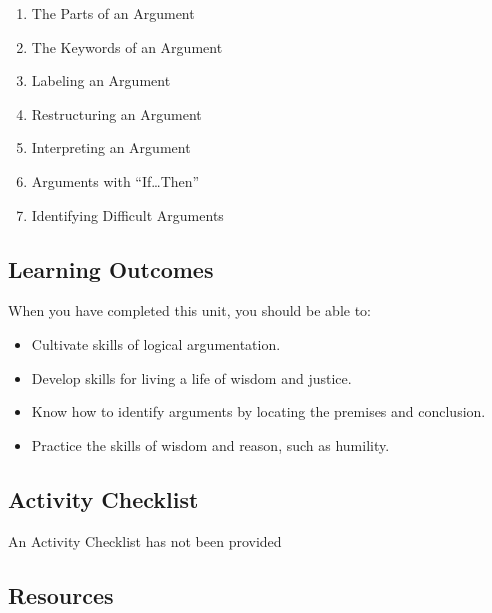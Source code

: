 \documentclass[
]{book}
\providecommand{\tightlist}{%
  \setlength{\itemsep}{0pt}\setlength{\parskip}{0pt}}
\begin{document}
\begin{enumerate}
\def\labelenumi{\arabic{enumi}.}
\tightlist
\item
  The Parts of an Argument\\
\item
  The Keywords of an Argument\\
\item
  Labeling an Argument\\
\item
  Restructuring an Argument\\
\item
  Interpreting an Argument\\
\item
  Arguments with ``If\ldots Then''\\
\item
  Identifying Difficult Arguments
\end{enumerate}

\hypertarget{learning-outcomes-1}{%
\subsection*{Learning Outcomes}\label{learning-outcomes-1}}

When you have completed this unit, you should be able to:

\begin{itemize}
\tightlist
\item
  Cultivate skills of logical argumentation.\\
\item
  Develop skills for living a life of wisdom and justice.\\
\item
  Know how to identify arguments by locating the premises and conclusion.\\
\item
  Practice the skills of wisdom and reason, such as humility.
\end{itemize}

\hypertarget{activity-checklist-1}{%
\subsection*{Activity Checklist}\label{activity-checklist-1}}

{An Activity Checklist has not been provided}

\hypertarget{resources-1}{%
\subsection*{Resources}\label{resources-1}}
\end{document}
